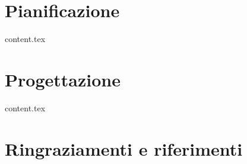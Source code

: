 \documentclass[12pt]{book}
\begin{document}
	
	
	\tableofcontents
	\cleardoublepage
	
	\part{Pianificazione}
	{content.tex}
	\part{Progettazione}
	{content.tex}
	
	\part{Ringraziamenti e riferimenti}
	\newpage
	
	
	
\end{document}
